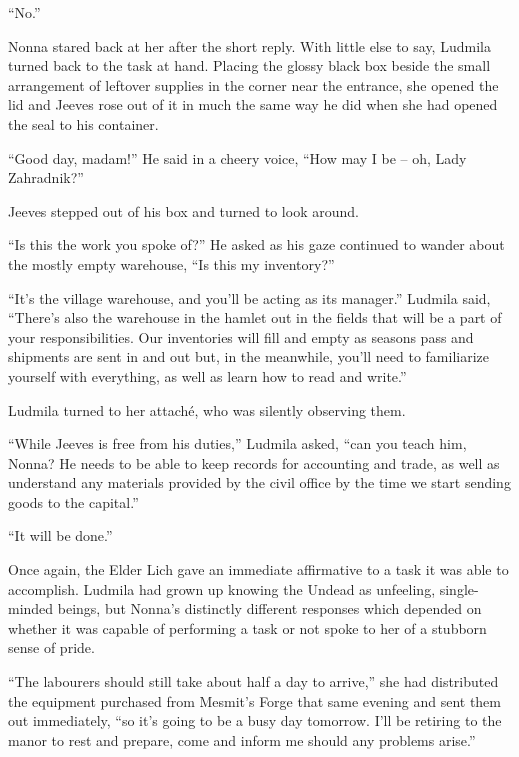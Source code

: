  

“No.”

 

Nonna stared back at her after the short reply. With little else to say, Ludmila turned back to the task at hand. Placing the glossy black box beside the small arrangement of leftover supplies in the corner near the entrance, she opened the lid and Jeeves rose out of it in much the same way he did when she had opened the seal to his container.

 

“Good day, madam!” He said in a cheery voice, “How may I be – oh, Lady Zahradnik?”

 

Jeeves stepped out of his box and turned to look around.

 

“Is this the work you spoke of?” He asked as his gaze continued to wander about the mostly empty warehouse, “Is this my inventory?”

 

“It’s the village warehouse, and you’ll be acting as its manager.” Ludmila said, “There’s also the warehouse in the hamlet out in the fields that will be a part of your responsibilities. Our inventories will fill and empty as seasons pass and shipments are sent in and out but, in the meanwhile, you’ll need to familiarize yourself with everything, as well as learn how to read and write.”

 

Ludmila turned to her attaché, who was silently observing them.

 

“While Jeeves is free from his duties,” Ludmila asked, “can you teach him, Nonna? He needs to be able to keep records for accounting and trade, as well as understand any materials provided by the civil office by the time we start sending goods to the capital.”

 

“It will be done.”

 

Once again, the Elder Lich gave an immediate affirmative to a task it was able to accomplish. Ludmila had grown up knowing the Undead as unfeeling, single-minded beings, but Nonna’s distinctly different responses which depended on whether it was capable of performing a task or not spoke to her of a stubborn sense of pride.

 

“The labourers should still take about half a day to arrive,” she had distributed the equipment purchased from Mesmit’s Forge that same evening and sent them out immediately, “so it’s going to be a busy day tomorrow. I’ll be retiring to the manor to rest and prepare, come and inform me should any problems arise.”

